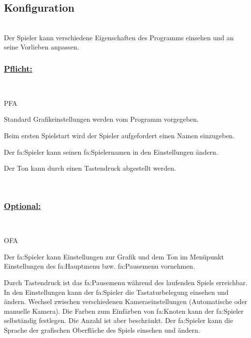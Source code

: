 %
%


\subsection{Konfiguration}

%
%
\renewcommand{\K}{}
%
%

~\\
Der Spieler kann verschiedene Eigenschaften des Programms einsehen und an seine Vorlieben anpassen.\\

%
%
\subsubsection*{\underline{Pflicht:}}~\\

\begin{ids}{\gls{PFA\K}}

 	\id[ 10] Standard Grafikeinstellungen werden vom Programm vorgegeben.
 	
 	\id[ 15] Beim ersten Spielstart wird der Spieler aufgefordert einen Namen einzugeben.
 		
 	\id[ 20] Der \gls{fa:Spieler} kann seinen \gls{fa:Spielername}n in den Einstellungen ändern.
 	
 	\id[ 25] Der Ton kann durch einen Tastendruck abgestellt werden.
	
\end{ids}

~\\


%
%
\subsubsection*{\underline{Optional:}}~\\


\begin{ids}{\gls{OFA\K}}

	\id[ 30] Der \gls{fa:Spieler} kann Einstellungen zur Grafik und dem Ton im Menüpunkt Einstellungen des \gls{fa:Hauptmenu} bzw. \gls{fa:Pausemenu} vornehmen.
	
	\id[ 40] Durch Tastendruck ist das \gls{fa:Pausemenu} während des laufenden Spiels erreichbar.	
	\id[ 50] In den Einstellungen kann der \gls{fa:Spieler} die Tastaturbelegung einsehen und  ändern.
 	\id[60] Wechsel zwischen verschiedenen Kameraeinstellungen (Automatische oder manuelle Kamera).
 	\id[ 70] Die Farben zum Einfärben von \gls{fa:Knoten} kann der \gls{fa:Spieler} selbständig festlegen. Die Anzahl ist aber beschränkt.
 	\id[ 80] Der \gls{fa:Spieler} kann die Sprache der grafischen Oberfläche des Spiels einsehen und ändern.
 	
 	
	
\end{ids}

~\\